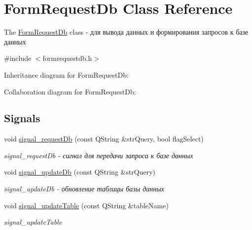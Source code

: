 \hypertarget{classFormRequestDb}{}\section{Form\+Request\+Db Class Reference}
\label{classFormRequestDb}


The \hyperlink{classFormRequestDb}{Form\+Request\+Db} class -\/ для вывода данных и формирования запросов к базе данных  




{\ttfamily \#include $<$formrequestdb.\+h$>$}



Inheritance diagram for Form\+Request\+Db\+:


Collaboration diagram for Form\+Request\+Db\+:
\subsection*{Signals}
\begin{DoxyCompactItemize}
\item 
void \hyperlink{classFormRequestDb_a8e2f772b54c5bc321bb2aafd410881af}{signal\+\_\+request\+Db} (const Q\+String \&str\+Query, bool flag\+Select)
\begin{DoxyCompactList}\small\item\em signal\+\_\+request\+Db -\/ сигнал для передачи запроса к базе данных \end{DoxyCompactList}\item 
void \hyperlink{classFormRequestDb_a975c3238a2e70f63172b2e7dd2a3d17d}{signal\+\_\+update\+Db} (const Q\+String \&str\+Query)
\begin{DoxyCompactList}\small\item\em signal\+\_\+update\+Db -\/ обновление таблицы базы данных \end{DoxyCompactList}\item 
void \hyperlink{classFormRequestDb_a3e6c1c86440f834a79f43e82a1568207}{signal\+\_\+update\+Table} (const Q\+String \&table\+Name)
\begin{DoxyCompactList}\small\item\em signal\+\_\+update\+Table \end{DoxyCompactList}\end{DoxyCompactItemize}
